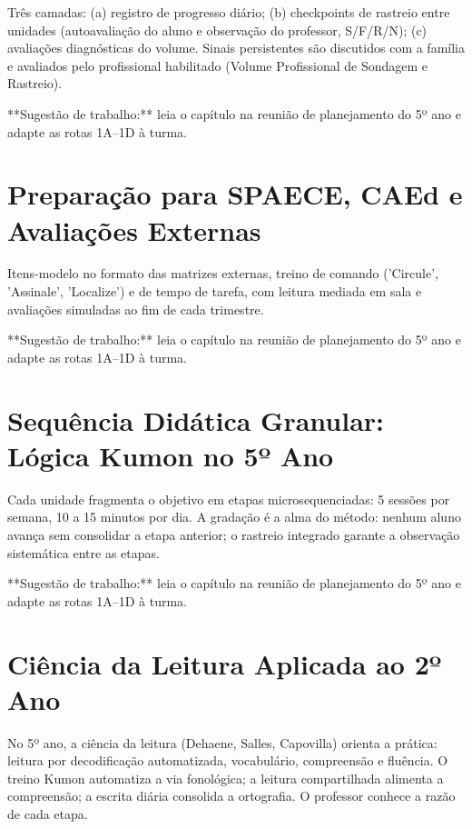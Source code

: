 Três camadas: (a) registro de progresso diário; (b) checkpoints de rastreio entre unidades (autoavaliação do aluno e observação do professor, S/F/R/N); (c) avaliações diagnósticas do volume. Sinais persistentes são discutidos com a família e avaliados pelo profissional habilitado (Volume Profissional de Sondagem e Rastreio).


\begin{dica}
**Sugestão de trabalho:** leia o capítulo na reunião de planejamento do 5º ano e adapte as rotas 1A–1D à turma.
\end{dica}

\chapter{Preparação para SPAECE, CAEd e Avaliações Externas}

Itens-modelo no formato das matrizes externas, treino de comando ('Circule', 'Assinale', 'Localize') e de tempo de tarefa, com leitura mediada em sala e avaliações simuladas ao fim de cada trimestre.


\begin{dica}
**Sugestão de trabalho:** leia o capítulo na reunião de planejamento do 5º ano e adapte as rotas 1A–1D à turma.
\end{dica}

\chapter{Sequência Didática Granular: Lógica Kumon no 5º Ano}

Cada unidade fragmenta o objetivo em etapas microsequenciadas: 5 sessões por semana, 10 a 15 minutos por dia. A gradação é a alma do método: nenhum aluno avança sem consolidar a etapa anterior; o rastreio integrado garante a observação sistemática entre as etapas.


\begin{dica}
**Sugestão de trabalho:** leia o capítulo na reunião de planejamento do 5º ano e adapte as rotas 1A–1D à turma.
\end{dica}

\chapter{Ciência da Leitura Aplicada ao 2º Ano}

No 5º ano, a ciência da leitura (Dehaene, Salles, Capovilla) orienta a prática: leitura por decodificação automatizada, vocabulário, compreensão e fluência. O treino Kumon automatiza a via fonológica; a leitura compartilhada alimenta a compreensão; a escrita diária consolida a ortografia. O professor conhece a razão de cada etapa.


